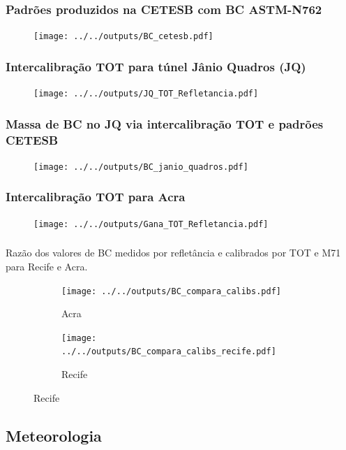 \begin{frame}
  \frametitle{Padrões produzidos na CETESB com BC ASTM-N762}
  \begin{figure}[H]
  	\centering
  	\texttt{[image: ../../outputs/BC\_cetesb.pdf]}
  \end{figure}
\end{frame}

\begin{frame}
  \frametitle{Intercalibração TOT para túnel Jânio Quadros (JQ)}
  \begin{figure}[H]
    \centering
    \texttt{[image: ../../outputs/JQ\_TOT\_Refletancia.pdf]}
  \end{figure}
\end{frame}

\begin{frame}
  \frametitle{Massa de BC no JQ via intercalibração TOT e padrões CETESB}
  \begin{figure}[H]
    \centering
      \texttt{[image: ../../outputs/BC\_janio\_quadros.pdf]}
  \end{figure}
\end{frame}

\begin{frame}
  \frametitle{Intercalibração TOT para Acra}
  \begin{figure}[H]
  	\begin{center}
  		\texttt{[image: ../../outputs/Gana\_TOT\_Refletancia.pdf]}
  	\end{center}
  \end{figure}
\end{frame}

\begin{frame}
  \frametitle{}
  Razão dos valores de BC medidos por refletância e calibrados por 
  TOT e M71 para Recife e Acra.
  \begin{figure}[H]
  	\centering
  	\begin{subfigure}[b]{0.44\linewidth}
  		\texttt{[image: ../../outputs/BC\_compara\_calibs.pdf]}
  		\caption{Acra}
  	\end{subfigure}
  		\hspace{0.3cm}
  	\begin{subfigure}[b]{0.44\linewidth}
  		\texttt{[image: ../../outputs/BC\_compara\_calibs\_recife.pdf]}
  		\caption{Recife}
  	\end{subfigure}%
   \end{figure}
\end{frame}

\subsection{Meteorologia}


